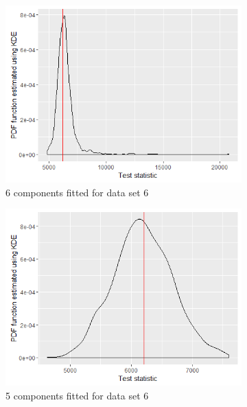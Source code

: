 \begin{figure}[!htb]
\begin{subfigure}[b]{0.4\textwidth}
		\includegraphics[width=\textwidth]{mainmatter/chapter_5_simulation_study/ppc_5wellsep6comp.png}
          \caption{\label{fig : ppc_5wellsep6comp}6 components fitted for data set 6}
	\end{subfigure}
	\begin{subfigure}[b]{0.4\textwidth}
		\includegraphics[width=\textwidth]{mainmatter/chapter_5_simulation_study/ppc_5wellsep5comp.png}
          \caption{\label{fig : ppc_5wellsep5comp}5 components fitted for data set 6}
	\end{subfigure}
	\begin{subfigure}[b]{0.4\textwidth}

\end{subfigure}
\end{figure}
